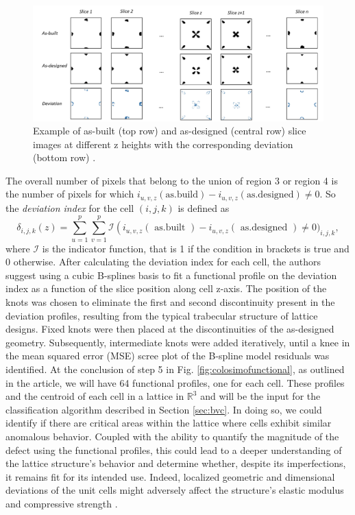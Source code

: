 \begin{figure}
    \centering
    \includegraphics[scale=0.5]{Images/slicescolosimo.png}
    \caption[Deviation index.]{Example of as-built (top row) and as-designed (central row) slice images at different z heights with the corresponding deviation (bottom row) \cite{colosimo_complex_2022}. }
    \label{fig:slices}
\end{figure}


The overall number of pixels that belong to the union of region 3 or region 4 is the number of pixels for which $i_{u,v,z}(\text{as.build}) - i_{u,v,z}(\text{as.designed}) \neq 0$. So the \emph{deviation index} for the cell $(i,j,k)$ is defined as
\begin{equation}
\label{eq:deviationindex}
\delta_{i, j, k}(z)= \sum_{u=1}^p \sum_{v=1}^p \mathcal{I}\left(i_{u, v, z}(\text { as.built })\right. -i_{u, v, z}(\text { as.designed })\neq 0)_{i, j, k},
\end{equation}
where $\mathcal{I}$ is the indicator function, that is 1 if the condition in brackets is true and 0 otherwise.
After calculating the deviation index for each cell, the authors suggest using a cubic B-splines basis to fit a functional profile on the deviation index as a function of the slice position along cell z-axis. The position of the knots was chosen to eliminate the first and second discontinuity present in the deviation profiles, resulting from the typical trabecular structure of lattice designs. Fixed knots were then placed at the discontinuities of the as-designed geometry. Subsequently, intermediate knots were added iteratively, until a knee in the mean squared error (MSE) scree plot of the B-spline model residuals was identified.
At the conclusion of step 5 in Fig. \ref{fig:colosimofunctional}, as outlined in the article, we will have 64 functional profiles, one for each cell. These profiles and the centroid of each cell in a lattice in $\mathbb{R}^3$ and will be the input for the classification algorithm described in Section \ref{sec:bvc}. In doing so, we could identify if there are critical areas within the lattice where cells exhibit similar anomalous behavior. Coupled with the ability to quantify the magnitude of the defect using the functional profiles, this could lead to a deeper understanding of the lattice structure's behavior and determine whether, despite its imperfections, it remains fit for its intended use. Indeed, localized geometric and dimensional deviations of the unit cells might adversely affect the structure's elastic modulus and compressive strength \cite{colosimo_complex_2022}.

